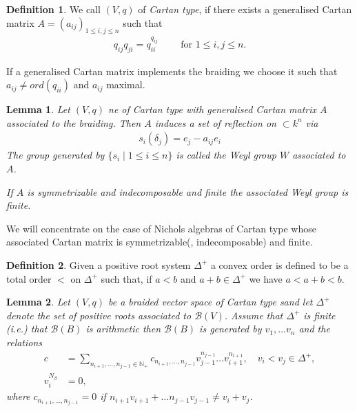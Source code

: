 \documentclass{amsart}
\newtheorem{lemma}{Lemma}
\theoremstyle{definition}
\newtheorem{definition}{Definition}
\newcommand{\Nichols}[1]{\ensuremath{\mathcal{B}(#1)}}
\begin{document}
	\begin{definition}
		We call $(V,q)$ of \emph{Cartan type}, if there exists a generalised Cartan matrix $A=(a_{ij})_{1\leq i,j \leq n}$ such that
		\begin{align}
			q_{ij}q_{ji}= q_{ii}^{q_{ij}} \qquad \text{ for } 1\leq i,j\leq n.
		\end{align}
	\end{definition}
	 If a generalised Cartan matrix implements the braiding we choose it such that 
	 $a_{ij} \neq ord(q_{ii})$ and $a_{ij}$ maximal.

	\begin{lemma}
		Let $(V,q)$ ne of Cartan type with generalised Cartan matrix $A$ associated to the braiding.
		Then $A$ induces a set of reflection on $\subset k^n$ via 
		\begin{align}
			s_i(\delta_j)= e_j - a_{ij}e_i
		\end{align}
		The group generated by $\{s_i \mid 1 \leq i \leq n\}$ is called the Weyl group $W$ associated to $A$.
		
		If $A$ is symmetrizable and indecomposable and finite the associated Weyl group is finite.
	\end{lemma}

	We will concentrate on the case of Nichols algebras of Cartan type whose associated Cartan matrix is symmetrizable(, indecomposable) and finite.
	
	\begin{definition}
		Given a positive root system $\Delta^+$  a convex order is defined to be a total order $<$ on $\Delta^+$ such that, if
		$a<b$ and $a+b \in \Delta^+$ we have $a< a+b< b$.
	\end{definition}
	
	\begin{lemma}
		Let $(V,q)$ be a braided vector space of Cartan type sand let $\Delta^+$ denote the set of positive roots associated to $\Nichols V$. Assume that $\Delta^+$ is finite (i.e.) that $\Nichols B$ is arithmetic then $\Nichols B$ is generated by $v_1, \dotsc v_n$ and the relations
		\begin{align}
			[v_i,v_j]c &= \sum_{n_{i+1},\dotsc, n_{j-1} \in \mathbb N_+} c_{n_{i+1},\dotsc, n_{j-1}} v_{j-1}^{n_{j-1}} \dotsc v_{i+1}^{n_{i+1}}, \quad v_i < v_j \in \Delta^+, \\
			v_i^{N_\beta} &= 0,
		\end{align}
		where $c_{n_{i+1},\dotsc, n_{j-1}} =0 $ if $n_{i+1}v_{i+1} + \dotsc n_{j-1} v_{j-1} \neq v_i + v_j$.
	\end{lemma}
\end{document}
